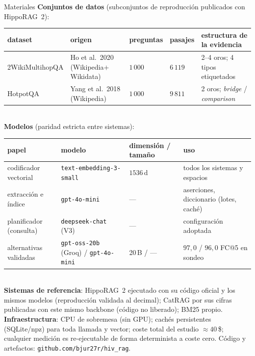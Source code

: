 \documentclass[aspectratio=169,10pt]{beamer}
\newcommand{\hippo}{HippoRAG~2}
\begin{document}
\begin{frame}{Materiales}
\centering\scriptsize
\setlength{\tabcolsep}{4pt}\renewcommand{\arraystretch}{1.2}
\textbf{Conjuntos de datos} (subconjuntos de reproducción publicados con \hippo{}):\\[0.5mm]
\begin{tabular}{@{}lllll@{}}
\toprule
dataset & origen & preguntas & pasajes & estructura de la evidencia\\
\midrule
2WikiMultihopQA & Ho et al.\ 2020 (Wikipedia$+$Wikidata) & $1\,000$ & $6\,119$ & 2--4 oros; 4 tipos etiquetados\\
HotpotQA & Yang et al.\ 2018 (Wikipedia) & $1\,000$ & $9\,811$ & 2 oros; \emph{bridge} / \emph{comparison}\\
\bottomrule
\end{tabular}\\[1.5mm]
\textbf{Modelos} (paridad estricta entre sistemas):\\[0.5mm]
\begin{tabular}{@{}llll@{}}
\toprule
papel & modelo & dimensión / tamaño & uso\\
\midrule
codificador vectorial & \texttt{text-embedding-3-small} & $1536$\,d & todos los sistemas y espacios\\
extracción e índice & \texttt{gpt-4o-mini} & --- & aserciones, diccionario (lotes, caché)\\
planificador (consulta) & \texttt{deepseek-chat} (V3) & --- & configuración adoptada\\
alternativas validadas & \texttt{gpt-oss-20b} (Groq) / \texttt{gpt-4o-mini} & 20\,B / --- & $97{,}0$ / $96{,}0$ FC@5 en sondeo\\
\bottomrule
\end{tabular}\\[1.5mm]
\textbf{Sistemas de referencia}: \hippo{} ejecutado con su código oficial y
los mismos modelos (reproducción validada al decimal); CatRAG por sus cifras
publicadas con este mismo backbone (código no liberado); BM25 propio.\\[1mm]
\textbf{Infraestructura}: CPU de sobremesa (sin GPU); cachés persistentes
(SQLite/npz) para toda llamada y vector; coste total del estudio
$\approx 40$\,\$; cualquier medición es re-ejecutable de forma determinista a
coste cero. Código y artefactos: \texttt{github.com/bjur27r/hiv\_rag}.
\end{frame}
\end{document}
